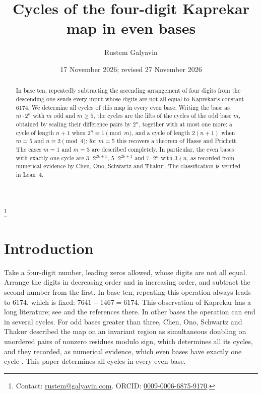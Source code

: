 \documentclass[11pt]{amsart}
\theoremstyle{definition}
\theoremstyle{remark}
\begin{document}
\title{Cycles of the four-digit Kaprekar map in even bases}
\author{Rustem Galyavin}
\thanks{Contact: \href{mailto:rustem@galyavin.com}{rustem@galyavin.com}. ORCID: \href{https://orcid.org/0009-0006-6875-9170}{0009-0006-6875-9170}.}
\date{17 November 2026; revised 27 November 2026}

\begin{abstract}
In base ten, repeatedly subtracting the ascending arrangement of four digits from the descending one sends every input whose digits are not all equal to Kaprekar's constant $6174$. We determine all cycles of this map in every even base. Writing the base as $m\cdot 2^n$ with $m$ odd and $m\ge5$, the cycles are the lifts of the cycles of the odd base $m$, obtained by scaling their difference pairs by $2^n$, together with at most one more: a cycle of length $n+1$ when $2^n\equiv1\pmod m$, and a cycle of length $2(n+1)$ when $m=5$ and $n\equiv2\pmod 4$; for $m=5$ this recovers a theorem of Hasse and Prichett. The cases $m=1$ and $m=3$ are described completely. In particular, the even bases with exactly one cycle are $3\cdot2^{2k+1}$, $5\cdot2^{2k+1}$ and $7\cdot2^n$ with $3\nmid n$, as recorded from numerical evidence by Chen, Ono, Schwartz and Thakur. The classification is verified in Lean~4.
\end{abstract}

\maketitle

\section{Introduction}

Take a four-digit number, leading zeros allowed, whose digits are not all equal. Arrange the digits in decreasing order and in increasing order, and subtract the second number from the first. In base ten, repeating this operation always leads to $6174$, which is fixed: $7641-1467=6174$. This observation of Kaprekar has a long literature; see \cite{DZ} and the references there. In other bases the operation can end in several cycles. For odd bases greater than three, Chen, Ono, Schwartz and Thakur \cite{COST} described the map on an invariant region as simultaneous doubling on unordered pairs of nonzero residues modulo sign, which determines all its cycles, and they recorded, as numerical evidence, which even bases have exactly one cycle \cite[Remark~28]{COST}. This paper determines all cycles in every even base.
\end{document}
